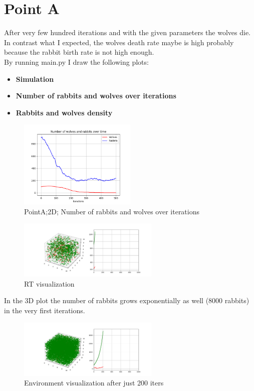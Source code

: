 \documentclass[unicode,11pt,a4paper,oneside,numbers=endperiod,openany]{scrartcl}
\begin{document}
\section*{Point A}
 After very few hundred iterations and with the given parameters the wolves die. In contrast what I expected, the wolves death rate maybe is high probably because the rabbit birth rate is not high enough.\\
By running main.py I draw the following plots:
\begin{itemize}
  \item \textbf{Simulation}
  \item \textbf{Number of rabbits and wolves over iterations}
  \item \textbf{Rabbits and wolves density}
\end{itemize}
\begin{figure}[H]
  \centering
  \includegraphics[width=0.5\textwidth]{output_main/PointA.png}
  \caption{PointA;2D; Number of rabbits and wolves over iterations}
\end{figure}
\begin{figure}[H]
  \centering
  \includegraphics[width=0.6\textwidth]{output3D/3DInitCondition.png}
  \caption{RT visualization}
\end{figure}
In the 3D plot the number of rabbits grows exponentially as well (8000 rabbits) in the very first iterations. 
\begin{figure}[H]
  \centering
  \includegraphics[width=0.6\textwidth]{output3D/secondPlotPointA.png}
  \caption{Environment visualization after just 200 iters} 
\end{figure}
\end{document}
